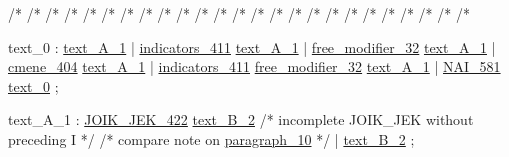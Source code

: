 /*%
/*%
/*%
/*%
/*%
/*%
/*%
/*%
/*%
/*%
/*%
/*%
/*%
/*%
/*%
/*%
/*%
/*%
/*%
/*%
/*%
/*%
/*%
/*%
/*%



\label{html:y0}
text_0                  :  \hyperref[html:y1]{text_A_1}
                        |  \hyperref[html:y411]{indicators_411}  \hyperref[html:y1]{text_A_1}
                        |  \hyperref[html:y32]{free_modifier_32}  \hyperref[html:y1]{text_A_1}
                        |  \hyperref[html:y404]{cmene_404}  \hyperref[html:y1]{text_A_1}
                        |  \hyperref[html:y411]{indicators_411}  \hyperref[html:y32]{free_modifier_32}  \hyperref[html:y1]{text_A_1}
                        |  \hyperref[html:y581]{NAI_581}  \hyperref[html:y0]{text_0}
                        ;

\label{html:y1}
text_A_1                :  \hyperref[html:y422]{JOIK_JEK_422}  \hyperref[html:y2]{text_B_2}
                        /* incomplete JOIK_JEK  without preceding I */
                        /* compare note on \hyperref[html:y10]{paragraph_10} */
                        |  \hyperref[html:y2]{text_B_2}
                        ;

